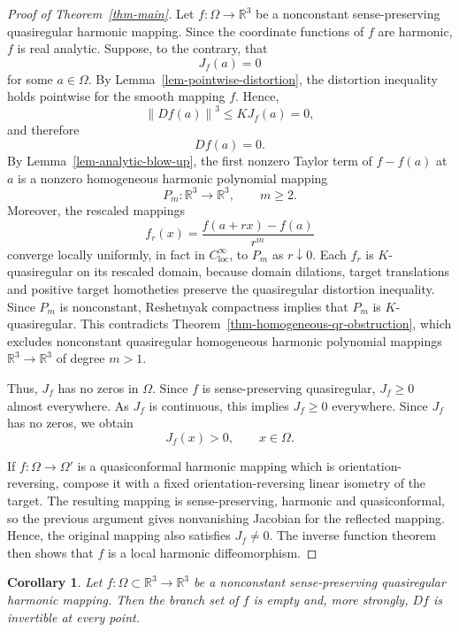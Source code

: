 \documentclass[10pt]{amsart}
\numberwithin{equation}{section}
\newtheorem{corollary}[theorem]{Corollary}
\theoremstyle{definition}
\newcommand{\R}{\mathbb R}
\newcommand{\norm}[1]{\left\|#1\right\|}
\begin{document}
\begin{proof}[Proof of Theorem~\ref{thm-main}]
Let \(f:\Omega\to\R^3\) be a nonconstant sense-preserving quasiregular
harmonic mapping. Since the coordinate functions of \(f\) are harmonic,
\(f\) is real analytic. Suppose, to the contrary, that
\[
        J_f(a)=0
\]
for some \(a\in\Omega\). By Lemma~\ref{lem-pointwise-distortion}, the
distortion inequality holds pointwise for the smooth mapping \(f\). Hence,
\[
        \norm{Df(a)}^3\le KJ_f(a)=0,
\]
and therefore
\[
        Df(a)=0.
\]
By Lemma~\ref{lem-analytic-blow-up}, the first nonzero Taylor term of
\(f-f(a)\) at \(a\) is a nonzero homogeneous harmonic polynomial mapping
\[
        P_m:\R^3\to\R^3,\qquad m\ge2.
\]
Moreover, the rescaled mappings
\[
        f_r(x)=\frac{f(a+rx)-f(a)}{r^m}
\]
converge locally uniformly, in fact in \(C^\infty_{\operatorname{loc}}\), to
\(P_m\) as \(r\downarrow0\). Each \(f_r\) is \(K\)-quasiregular on its
rescaled domain, because domain dilations, target translations and positive
target homotheties preserve the quasiregular distortion inequality. Since
\(P_m\) is nonconstant, Reshetnyak compactness implies that \(P_m\) is
\(K\)-quasiregular. This contradicts
Theorem~\ref{thm-homogeneous-qr-obstruction}, which excludes nonconstant
quasiregular homogeneous harmonic polynomial mappings \(\R^3\to\R^3\) of
degree \(m>1\).

Thus, \(J_f\) has no zeros in \(\Omega\). Since \(f\) is sense-preserving
quasiregular, \(J_f\ge0\) almost everywhere. As \(J_f\) is continuous, this
implies \(J_f\ge0\) everywhere. Since \(J_f\) has no zeros, we obtain
\[
        J_f(x)>0,
        \qquad
        x\in\Omega.
\]

If \(f:\Omega\to\Omega'\) is a quasiconformal harmonic mapping which is
orientation-reversing, compose it with a fixed orientation-reversing linear
isometry of the target. The resulting mapping is sense-preserving, harmonic
and quasiconformal, so the previous argument gives nonvanishing Jacobian for
the reflected mapping. Hence, the original mapping also satisfies \(J_f\ne0\).
The inverse function theorem then shows that \(f\) is a local harmonic
diffeomorphism.
\end{proof}

\begin{corollary}
Let \(f:\Omega\subset\R^3\to\R^3\) be a nonconstant sense-preserving
quasiregular harmonic mapping. Then the branch set of \(f\) is empty and, more
strongly, \(Df\) is invertible at every point.
\end{corollary}
\end{document}
